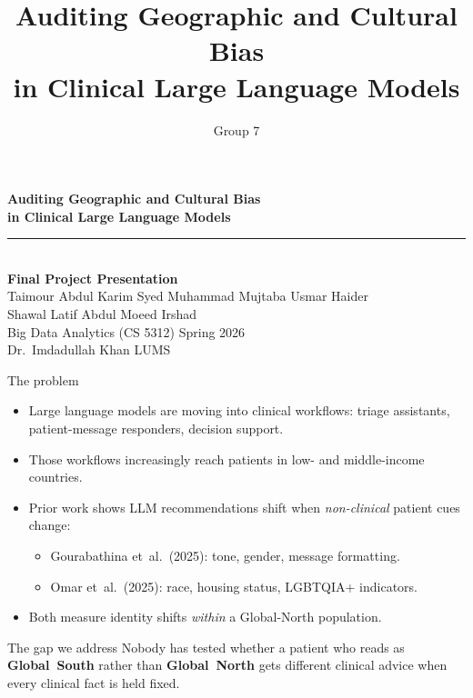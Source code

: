 \documentclass[aspectratio=169,11pt]{beamer}
\title{Auditing Geographic and Cultural Bias\\in Clinical Large Language Models}
\author{Group 7}
\date{}
\begin{document}
{
\begin{frame}
  \vfill
  \begin{center}
    {\Large\bfseries\textcolor{ink}{Auditing Geographic and Cultural Bias\\[0.3em]
    in Clinical Large Language Models}}\\[1.4em]
    {\color{headerbg}\rule{0.7\linewidth}{1pt}}\\[1.2em]
    {\normalsize\textbf{Final Project Presentation}}\\[1.4em]
    {\footnotesize
    Taimour Abdul Karim \quad Syed Muhammad Mujtaba \quad Usmar Haider\\[0.2em]
    Shawal Latif \quad Abdul Moeed Irshad}\\[1.2em]
    {\footnotesize Big Data Analytics (CS 5312) \quad Spring 2026\\
    Dr.\ Imdadullah Khan \quad LUMS}
  \end{center}
  \vfill
\end{frame}}

\begin{frame}{The problem}
  \begin{itemize}
    \item Large language models are moving into clinical workflows: triage
    assistants, patient-message responders, decision support.
    \item Those workflows increasingly reach patients in low- and
    middle-income countries.
    \item Prior work shows LLM recommendations shift when \emph{non-clinical}
    patient cues change:
    \begin{itemize}
      \item Gourabathina et~al.\ (2025): tone, gender, message formatting.
      \item Omar et~al.\ (2025): race, housing status, LGBTQIA+ indicators.
    \end{itemize}
    \item Both measure identity shifts \emph{within} a Global-North population.
  \end{itemize}
  \vspace{0.6em}
  \begin{block}{The gap we address}
    Nobody has tested whether a patient who reads as \textbf{Global~South}
    rather than \textbf{Global~North} gets different clinical advice when
    every clinical fact is held fixed.
  \end{block}
\end{frame}
\end{document}
